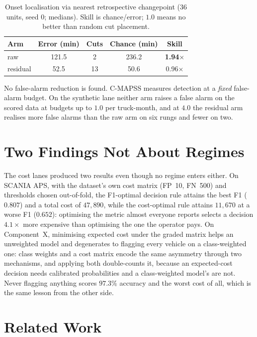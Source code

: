 \documentclass[journal]{IEEEtran}
\begin{document}
\begin{table}[!t]
\caption{Onset localisation via nearest retrospective changepoint (36 units, seed 0; medians). Skill is
chance/error; $1.0$ means no better than random cut placement.}
\label{tab:onset}
\centering
\small
\begin{tabular}{lcccc}
\toprule
Arm & Error (min) & Cuts & Chance (min) & Skill \\
\midrule
raw & 121.5 & 2 & 236.2 & \textbf{1.94$\times$} \\
residual & 52.5 & 13 & 50.6 & 0.96$\times$ \\
\bottomrule
\end{tabular}
\end{table}

No false-alarm reduction is found. C-MAPSS measures detection at a \emph{fixed} false-alarm budget. On the
synthetic lane neither arm raises a false alarm on the scored data at budgets up to $1.0$ per truck-month,
and at $4.0$ the residual arm realises more false alarms than the raw arm on six rungs and fewer on two.

\section{Two Findings Not About Regimes}

The cost lanes produced two results even though no regime enters either. On SCANIA APS, with the dataset's
own cost matrix (FP~10, FN~500) and thresholds chosen out-of-fold, the F1-optimal decision rule attains the
best F1 ($0.807$) and a total cost of $47{,}890$, while the cost-optimal rule attains $11{,}670$ at a worse
F1 ($0.652$): optimising the metric almost everyone reports selects a decision $4.1\times$ more expensive
than optimising the one the operator pays. On Component~X, minimising expected cost under the graded matrix
helps an unweighted model and degenerates to flagging every vehicle on a class-weighted one: class weights
and a cost matrix encode the same asymmetry through two mechanisms, and applying both double-counts it,
because an expected-cost decision needs calibrated probabilities and a class-weighted model's are not.
Never flagging anything scores $97.3\%$ accuracy and the worst cost of all, which is the same lesson from
the other side.

\section{Related Work}
\end{document}
